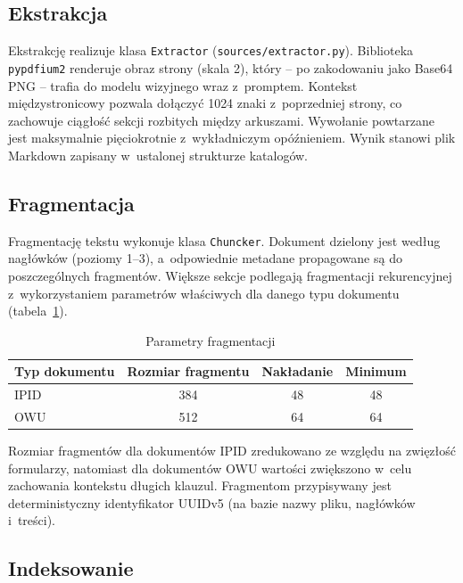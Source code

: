 \subsection{Ekstrakcja}\label{subsec:ekstrakcja}

Ekstrakcję realizuje klasa \texttt{Extractor} (\texttt{sources/extractor.py}).
Biblioteka \texttt{pypdfium2} renderuje obraz strony (skala 2), który -- po
zakodowaniu jako Base64 PNG -- trafia do modelu wizyjnego wraz z~promptem.
Kontekst międzystronicowy pozwala dołączyć 1024 znaki z~poprzedniej strony, co
zachowuje ciągłość sekcji rozbitych między arkuszami. Wywołanie powtarzane jest
maksymalnie pięciokrotnie z~wykładniczym opóźnieniem. Wynik stanowi plik
Markdown zapisany w~ustalonej strukturze katalogów.

\subsection{Fragmentacja}\label{subsec:fragmentacja}

Fragmentację tekstu wykonuje klasa \texttt{Chuncker}. Dokument dzielony jest
według nagłówków (poziomy 1--3), a~odpowiednie metadane propagowane są do
poszczególnych fragmentów. Większe sekcje podlegają fragmentacji rekurencyjnej
z~wykorzystaniem parametrów właściwych dla danego typu dokumentu
(tabela~\ref{tab:parametry-fragmentacji}).

\begin{table}[H]
  \caption{Parametry fragmentacji}\label{tab:parametry-fragmentacji}
  \centering
  \small
  \begin{tabular}{@{} l c c c @{}}
    \toprule
    \textbf{Typ dokumentu}
    & \textbf{Rozmiar fragmentu}
    & \textbf{Nakładanie}
    & \textbf{Minimum}                     \\
    \midrule
    IPID & 384                        & 48 & 48 \\
    OWU  & 512                        & 64 & 64 \\
    \bottomrule
  \end{tabular}
\end{table}

Rozmiar fragmentów dla dokumentów IPID zredukowano ze względu na zwięzłość
formularzy, natomiast dla dokumentów OWU wartości zwiększono w~celu zachowania
kontekstu długich klauzul. Fragmentom przypisywany jest deterministyczny
identyfikator UUIDv5 (na bazie nazwy pliku, nagłówków i~treści).

\subsection{Indeksowanie}\label{subsec:indeksowanie}

